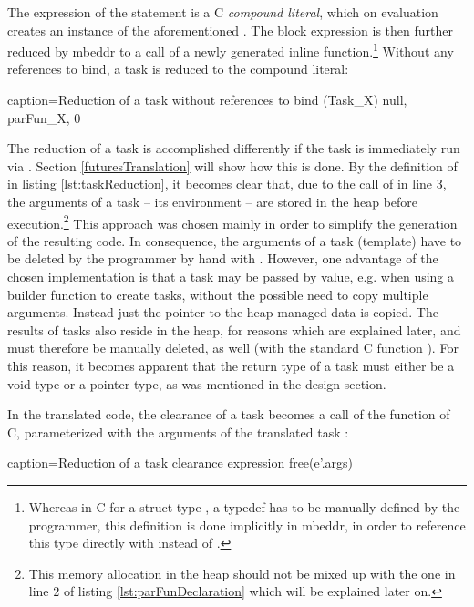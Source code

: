 The expression of the  statement is a C \textit{compound literal}, which on evaluation creates an instance of the aforementioned . The block expression is then further reduced by mbeddr to a call of a newly generated inline function.\footnote{Whereas in C for a struct type , a typedef has to be manually defined by the programmer, this definition is done implicitly in mbeddr, in order to reference this type directly with  instead of .} Without any references to bind, a task is reduced to the compound literal:

\begin{ccode}{caption=Reduction of a task without references to bind}
(Task_X){ null, parFun_X, 0 }
\end{ccode}

The reduction of a task is accomplished differently if the task is immediately run via . Section \ref{futuresTranslation} will show how this is done. By the definition of  in listing \ref{lst:taskReduction}, it becomes clear that, due to the call of  in line 3, the arguments of a task -- its environment -- are stored in the heap before execution.\footnote{This memory allocation in the heap should not be mixed up with the one in line 2 of listing \ref{lst:parFunDeclaration} which will be explained later on.} This approach was chosen mainly in order to simplify the generation of the resulting code. In consequence, the arguments of a task (template) have to be deleted by the programmer by hand with . However, one advantage of the chosen implementation is that a task may be passed by value, e.g. when using a builder function to create tasks, without the possible need to copy multiple arguments. Instead just the pointer to the heap-managed data is copied. The results of tasks also reside in the heap, for reasons which are explained later, and must therefore be manually deleted, as well (with the standard C function ). For this reason, it becomes apparent that the return type of a task must either be a void type or a pointer type, as was mentioned in the design section.   

In the translated code, the clearance  of a task becomes a call of the  function of C, parameterized with the arguments of the translated task :
\begin{ccode}{caption=Reduction of a task clearance expression}
free(e'.args)
\end{ccode}

